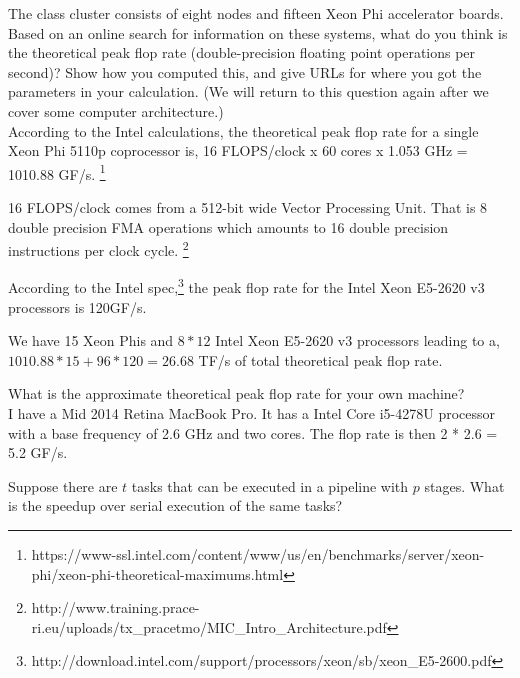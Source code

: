 \documentclass{5220hw}
\begin{document}

\maketitle

\begin{exercises}

\item The class cluster consists of eight nodes and fifteen Xeon Phi accelerator boards.  Based on an online search for information on these systems, what do you think is the theoretical peak flop rate (double-precision floating point operations per second)?  Show how you computed this, and give URLs for where you got the parameters in your calculation.  (We will return to this question again after we cover some computer architecture.) \\

According to the Intel calculations, the theoretical peak flop rate for a single Xeon Phi 5110p coprocessor is,
16 FLOPS/clock x 60 cores x 1.053 GHz = 1010.88 GF/s. 
\footnote{https://www-ssl.intel.com/content/www/us/en/benchmarks/server/xeon-phi/xeon-phi-theoretical-maximums.html} 

16 FLOPS/clock comes from a 512-bit wide Vector Processing Unit. That is 8 double precision FMA operations which amounts to 16 double precision instructions per clock cycle. 
\footnote{http://www.training.prace-ri.eu/uploads/tx\_pracetmo/MIC\_Intro\_Architecture.pdf}

According to the Intel spec,\footnote{http://download.intel.com/support/processors/xeon/sb/xeon\_E5-2600.pdf} the peak flop rate for the Intel Xeon E5-2620 v3 processors is 120GF/s. 

We have 15 Xeon Phis and $8 * 12$ Intel Xeon E5-2620 v3 processors leading to a, \\
$1010.88 * 15 + 96 * 120 = 26.68$ TF/s of total theoretical peak flop rate. \\

\item What is the approximate theoretical peak flop rate for your own machine? \\

I have a Mid 2014 Retina MacBook Pro. It has a Intel Core i5-4278U processor with a base frequency of 2.6 GHz and two cores. The flop rate is then 2 * 2.6 = 5.2 GF/s. \\

\item Suppose there are $t$ tasks that can be executed in a pipeline with $p$ stages.  What is the speedup over serial execution of the same tasks? \\


\end{exercises}
\end{document}
